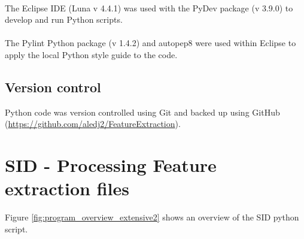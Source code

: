 \paragraph*{}
The Eclipse \ac{IDE} (Luna v 4.4.1) \cite{the_eclipse_foundation_eclipse_????} was used with the PyDev package (v 3.9.0) \cite{pydev_python_????} to develop and run Python scripts.
\paragraph*{}
The Pylint Python package (v 1.4.2) \cite{pylint_code_????} and autopep8 were used within Eclipse to apply the local Python style guide to the code.

\subsection{Version control}
Python code was version controlled using Git and backed up using GitHub (\url{https://github.com/aledj2/FeatureExtraction}).


\section{SID - Processing Feature extraction files}
Figure \ref{fig:program_overview_extensive2} shows an overview of the SID python script.

